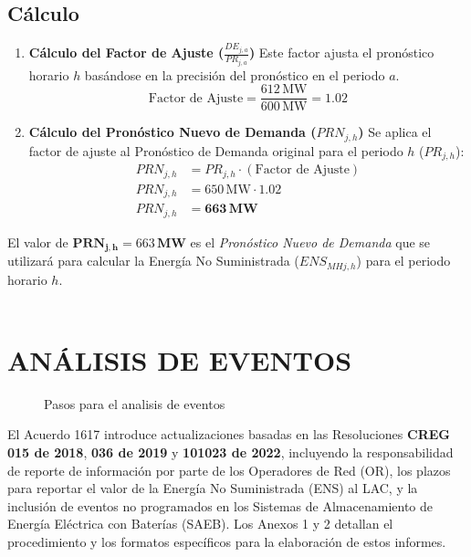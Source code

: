 \documentclass[a5paper]{book}%
\begin{document}
\subsection*{Cálculo}

\begin{enumerate}
	\item \textbf{Cálculo del Factor de Ajuste ($\frac{DE_{j,a}}{PR_{j,a}}$)}
	Este factor ajusta el pronóstico horario $h$ basándose en la precisión del pronóstico en el periodo $a$.
	\begin{equation*}
		\text{Factor de Ajuste} = \frac{612 \, \text{MW}}{600 \, \text{MW}} = 1.02
	\end{equation*}
	
	\item \textbf{Cálculo del Pronóstico Nuevo de Demanda ($PRN_{j,h}$)}
	Se aplica el factor de ajuste al Pronóstico de Demanda original para el periodo $h$ ($PR_{j,h}$):
	\begin{align*}
		PRN_{j,h} &= PR_{j,h} \cdot (\text{Factor de Ajuste}) \\
		PRN_{j,h} &= 650 \, \text{MW} \cdot 1.02 \\
		PRN_{j,h} &= \mathbf{663 \, \text{MW}}
	\end{align*}
\end{enumerate}

El valor de $\mathbf{PRN_{j,h}} = 663 \, \mathbf{MW}$ es el \textit{Pronóstico Nuevo de Demanda} que se utilizará para calcular la Energía No Suministrada ($ENS_{MHj,h}$) para el periodo horario $h$.\\\\

\section{ANÁLISIS DE EVENTOS}

\begin{figure}[H]
	\centering
	\caption{Pasos para el analisis de eventos}
	\label{fig:analisiseventosxm}
\end{figure}


\vspace{0.5cm}

El Acuerdo 1617 introduce actualizaciones basadas en las Resoluciones \textbf{CREG 015 de 2018}, \textbf{036 de 2019} y \textbf{101023 de 2022}, incluyendo la responsabilidad de reporte de información por parte de los Operadores de Red (OR), los plazos para reportar el valor de la Energía No Suministrada (ENS) al LAC, y la inclusión de eventos no programados en los Sistemas de Almacenamiento de Energía Eléctrica con Baterías (SAEB). Los Anexos 1 y 2 detallan el procedimiento y los formatos específicos para la elaboración de estos informes.
\end{document}
